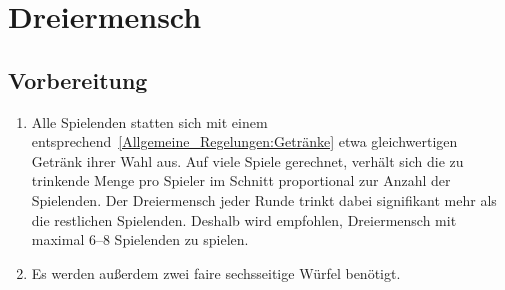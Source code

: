 \chapter{Dreiermensch}

\section{Vorbereitung}
\begin{enumerate}[label={(\arabic*)}]	
	\item
	Alle Spielenden statten sich mit einem entsprechend~\ref{Allgemeine_Regelungen:Getränke} etwa gleichwertigen Getränk ihrer Wahl aus.
	Auf viele Spiele gerechnet, verhält sich die zu trinkende Menge pro Spieler im Schnitt proportional zur Anzahl der Spielenden.
	Der Dreiermensch jeder Runde trinkt dabei signifikant mehr als die restlichen Spielenden.
	Deshalb wird empfohlen, Dreiermensch mit maximal 6--8 Spielenden zu spielen.
	
	\item
	Es werden außerdem zwei faire sechsseitige Würfel benötigt.
\end{enumerate}

